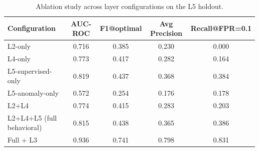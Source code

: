 \begin{table}[!t]
\centering
\caption{Ablation study across layer configurations on the L5 holdout.}
\label{tab:ablation}
\begin{tabular}{lcccc}
\toprule
Configuration & AUC-ROC & F1@optimal & Avg Precision & Recall@FPR=0.1 \\
\midrule
L2-only & 0.716 & 0.385 & 0.230 & 0.000 \\
L4-only & 0.773 & 0.417 & 0.282 & 0.164 \\
L5-supervised-only & 0.819 & 0.437 & 0.368 & 0.384 \\
L5-anomaly-only & 0.572 & 0.254 & 0.176 & 0.178 \\
L2+L4 & 0.774 & 0.415 & 0.283 & 0.203 \\
L2+L4+L5 (full behavioral) & 0.815 & 0.438 & 0.365 & 0.386 \\
Full + L3 & 0.936 & 0.741 & 0.798 & 0.831 \\
\bottomrule
\end{tabular}
\end{table}